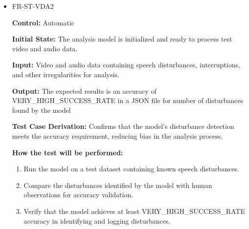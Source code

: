 \documentclass[12pt, titlepage]{article}
\begin{document}
\begin{itemize}
  \item FR-ST-VDA2
  \begin{mdframed}[linewidth=0.5mm]
      \textbf{Control:} Automatic \par
      \textbf{Initial State:} The analysis model is initialized and ready to process test video and audio data. \par
      \textbf{Input:} Video and audio data containing speech disturbances, interruptions, and other irregularities for analysis. \par
      \textbf{Output:} The expected results is an accuracy of VERY\_HIGH\_SUCCESS\_RATE in a JSON file for number of disturbances found by the model \par
      \textbf{Test Case Derivation:} Confirms that the model’s disturbance detection meets the accuracy requirement, reducing bias in the analysis process. \par
      \textbf{How the test will be performed:}
      \begin{enumerate}[noitemsep]
        \item Run the model on a test dataset containing known speech disturbances.
        \item Compare the disturbances identified by the model with human observations for accuracy validation.
        \item Verify that the model achieves at least VERY\_HIGH\_SUCCESS\_RATE accuracy in identifying and logging disturbances.
      \end{enumerate}
  \end{mdframed}


\end{itemize}
\end{document}
